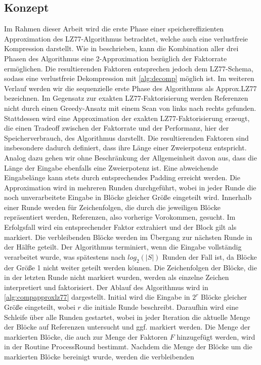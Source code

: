 \subsection{Konzept}
Im Rahmen dieser Arbeit wird die erste Phase einer speichereffizienten Approximation des LZ77-Algorithmus betrachtet, welche auch eine verlustfreie Kompression darstellt. Wie in
\cite{ApproxLZ77} beschrieben, kann die Kombination aller drei Phasen des Algorithmus eine 2-Approximation bezüglich der Faktorrate ermöglichen. Die resultierenden Faktoren entsprechen
jedoch dem LZ77-Schema, sodass eine verlustfreie Dekompression mit \ref{alg:decomp} möglich ist. Im weiteren Verlauf werden wir die sequenzielle erste Phase des Algorithmus als 
Approx.LZ77 bezeichnen. Im Gegensatz zur exakten LZ77-Faktorisierung werden Referenzen nicht durch einen Greedy-Ansatz mit einem Scan von links nach rechts gefunden. Stattdessen wird 
eine Approximation der exakten LZ77-Faktorisierung erzeugt, die einen Tradeoff zwischen der Faktorrate und der Performanz, hier der Speicherverbrauch, des Algorithmus darstellt. Die
resultierenden Faktoren sind insbesondere dadurch definiert, dass ihre Länge einer Zweierpotenz entspricht. Analog dazu gehen wir ohne Beschränkung der Allgemeinheit davon aus, dass
die Länge der Eingabe ebenfalls eine Zweierpotenz ist. Eine abweichende Eingabelänge kann stets durch entsprechendes Padding erreicht werden. Die Approximation wird in mehreren Runden
durchgeführt, wobei in jeder Runde die noch unverarbeitete Eingabe in Blöcke gleicher Größe eingeteilt wird. Innerhalb einer Runde werden für Zeichenfolgen, die durch die jeweiligen
Blöcke repräsentiert werden, Referenzen, also vorherige Vorokommen, gesucht. Im Erfolgsfall wird ein entsprechender Faktor extrahiert und der Block gilt als markiert. Die verbleibenden
Blöcke werden im Übergang zur nächsten Runde in der Hälfte geteilt. Der Algorithmus terminiert, wenn die Eingabe vollständig verarbeitet wurde, was spätestens nach $log_2(|S|)$ Runden
der Fall ist, da Blöcke der Größe 1 nicht weiter geteilt werden können. Die Zeichenfolgen der Blöcke, die in der letzten Runde nicht markiert wurden, werden als einzelne Zeichen interpretiert
und faktorisiert. Der Ablauf des Algorithmus wird in \ref{alg:compapproxlz77} dargestellt. Initial wird die Eingabe in $2^r$ Blöcke gleicher Größe eingeteilt, wobei $r$ die initiale Runde beschreibt.
Daraufhin wird eine Schleife über alle Runden gestartet, wobei in jeder Iteration die aktuelle Menge der Blöcke auf Referenzen untersucht und ggf. markiert werden. Die Menge der markierten Blöcke,
die auch zur Menge der Faktoren $F$ hinzugefügt werden, wird in der Routine ProcessRound bestimmt. Nachdem die Menge der Blöcke um die markierten Blöcke bereinigt wurde, werden die verbleibenden
